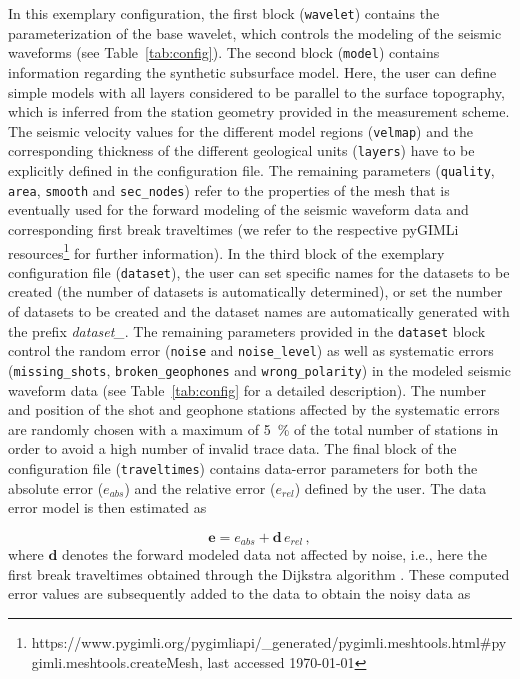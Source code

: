 \documentclass[a4paper,fleqn]{cas-sc}
\newcommand{\vecmat}[1]{\bm #1}
\begin{document}
In this exemplary configuration, the first block (\texttt{wavelet}) contains the parameterization of the base wavelet, which controls the modeling of the seismic waveforms (see Table~\ref{tab:config}).
The second block (\texttt{model}) contains information regarding the synthetic subsurface model. Here, the user can define simple models with all layers considered to be parallel to the surface topography, which is inferred from the station geometry provided in the measurement scheme. The seismic velocity values for the different model regions (\texttt{velmap}) and the corresponding thickness of the different geological units (\texttt{layers}) have to be explicitly defined in the configuration file. The remaining parameters (\texttt{quality}, \texttt{area}, \texttt{smooth} and \texttt{sec\_nodes}) refer to the properties of the mesh that is eventually used for the forward modeling of the seismic waveform data and corresponding first break traveltimes (we refer to the respective pyGIMLi resources\footnote{https://www.pygimli.org/pygimliapi/\_generated/pygimli.meshtools.html\#pygimli.meshtools.createMesh, last accessed \today} for further information).
In the third block of the exemplary configuration file (\texttt{dataset}), the user can set specific names for the datasets to be created (the number of datasets is automatically determined), or set the number of datasets to be created and the dataset names are automatically generated with the prefix \textit{dataset\_}.
The remaining parameters provided in the \texttt{dataset} block control the random error (\texttt{noise} and \texttt{noise\_level}) as well as systematic errors (\texttt{missing\_shots}, \texttt{broken\_geophones} and \texttt{wrong\_polarity}) in the modeled seismic waveform data (see Table~\ref{tab:config} for a detailed description).
The number and position of the shot and geophone stations affected by the systematic errors are randomly chosen with a maximum of \qty{5}{\%} of the total number of stations in order to avoid a high number of invalid trace data.
The final block of the configuration file (\texttt{traveltimes}) contains data-error parameters for both the absolute error ($e_{abs}$) and the relative error ($e_{rel}$) defined by the user. The data error model is then estimated as

\begin{equation}
	\vecmat{e} = e_{abs} + \vecmat{d}\,e_{rel}\,, 
	\label{eq:esterr}
\end{equation}
where $\vecmat{d}$ denotes the forward modeled data not affected by noise, i.e., here the first break traveltimes obtained through the Dijkstra algorithm \citep{dijkstra1959}. These computed error values are subsequently added to the data to obtain the noisy data as
\end{document}
